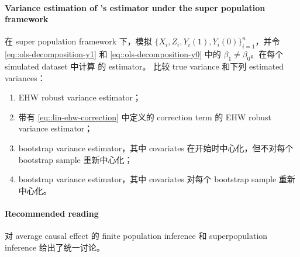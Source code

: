  
\paragraph{Variance estimation of \citet{lin2013}'s estimator under the super population framework}\label{hw::variance-bootstrap-superpopulation}
 
在 super population framework 下，模拟 $\{  X_i, Z_i, Y_i(1), Y_i(0) \}_{i=1}^n$，并令 \eqref{eq::ols-decomposition-y1} 和 \eqref{eq::ols-decomposition-y0} 中的 $\beta_1 \neq \beta_0$。在每个 simulated dataset 中计算 \citet{lin2013} 的 estimator。
比较 true variance 和下列 estimated variances：
\begin{enumerate}
\item
EHW robust variance estimator；
\item
带有 \eqref{eq::lin-ehw-correction} 中定义的 correction term 的 EHW robust variance estimator；
\item
bootstrap variance estimator，其中 covariates 在开始时中心化，但不对每个 bootstrap sample 重新中心化；
\item
bootstrap variance estimator，其中 covariates 对每个 bootstrap sample 重新中心化。
\end{enumerate}

  
 


\paragraph{Recommended reading}


\citet{ding2017bridging} 对 average causal effect 的 finite population inference 和 superpopulation inference 给出了统一讨论。 
